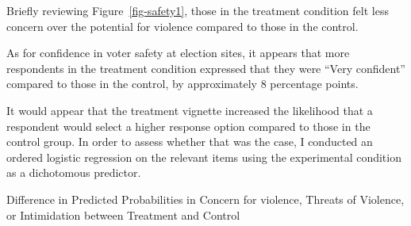 \documentclass[
  12pt,
  letterpaper,
]{article}
\begin{document}
Briefly reviewing Figure~\ref{fig-safety1}, those in the treatment
condition felt less concern over the potential for violence compared to
those in the control.

As for confidence in voter safety at election sites, it appears that
more respondents in the treatment condition expressed that they were
``Very confident'' compared to those in the control, by approximately
\(8\) percentage points.

It would appear that the treatment vignette increased the likelihood
that a respondent would select a higher response option compared to
those in the control group. In order to assess whether that was the
case, I conducted an ordered logistic regression on the relevant items
using the experimental condition as a dichotomous predictor.

\begin{table}[H]

\caption{\label{tbl-preds-diff1}Difference in Predicted Probabilities in
Concern for violence, Threats of Violence, or Intimidation between
Treatment and Control}


\end{table}%
\end{document}
